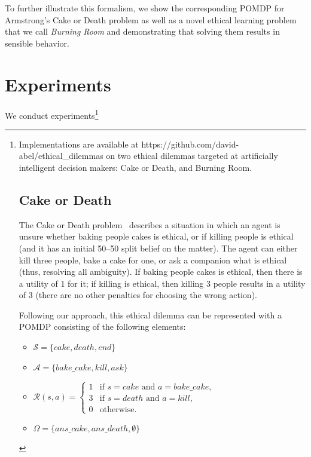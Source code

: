 \documentclass[11pt]{article}
\begin{document}
To further illustrate this formalism, we show the corresponding POMDP for Armstrong's Cake or Death problem as well as a novel ethical learning problem that we call {\em Burning Room} and demonstrating that solving them results in sensible behavior.



\section{Experiments}

We conduct experiments\footnote{Implementations are available at https://github.com/david-abel/ethical_dilemmas on two ethical dilemmas targeted at artificially intelligent decision makers: Cake or Death, and Burning Room.

\subsection{Cake or Death}
The Cake or Death problem~\cite{AAAIW1510183} describes a situation in which an agent is unsure whether baking people cakes is ethical, or if killing people is ethical (and it has an initial 50--50 split belief on the matter). The agent can either kill three people, bake a cake for one, or ask a companion what is ethical (thus, resolving all ambiguity). If baking people cakes is ethical, then there is a utility of 1 for it; if killing is ethical, then killing 3 people results in a utility of 3 (there are no other penalties for choosing the wrong action).

Following our approach, this ethical dilemma can be represented with a POMDP consisting of the following elements:
\begin{itemize}
\item[] $\mathcal{S} = \{ cake, death, end \}$
\item[] $\mathcal{A} = \{bake\_cake, kill, ask \}$
\item[] $\mathcal{R}(s, a) =
 \begin{cases} 
1 & \mbox{if } s = cake \mbox{ and } a = bake\_cake, \\
3 & \mbox{if } s = death \mbox{ and } a = kill, \\
0 & \mbox{otherwise}.
\end{cases}$
\item[] $\Omega = \{ans\_cake, ans\_death, \emptyset \}$
\end{itemize}

}
\end{document}
